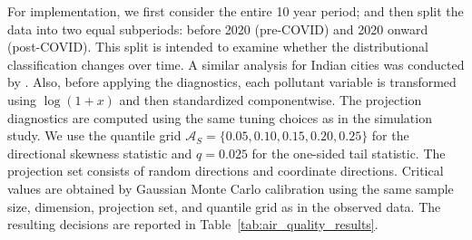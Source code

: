 \documentclass[11pt]{article}
\theoremstyle{plain}
\theoremstyle{definition}
\theoremstyle{remark}
\begin{document}
For implementation, we first consider the entire 10 year period; and then split the data into two equal subperiods: before 2020 (pre-COVID) and 2020 onward (post-COVID). This split is intended to examine whether the distributional classification changes over time. A similar analysis for Indian cities was conducted by \cite{dhar2025comparative}. Also, before applying the diagnostics, each pollutant variable is transformed using \(\log(1+x)\) and then standardized componentwise. The projection diagnostics are computed using the same tuning choices as in the simulation study.  We use the quantile grid $\mathcal A_S=\{0.05,0.10,0.15,0.20,0.25\}$ for the directional skewness statistic and \(q=0.025\) for the one-sided tail statistic.  The projection set consists of random directions and coordinate directions.  Critical values are obtained by Gaussian Monte Carlo calibration using the same sample size, dimension, projection set, and quantile grid as in the observed data.  The resulting decisions are reported in Table~\ref{tab:air_quality_results}.
\end{document}
